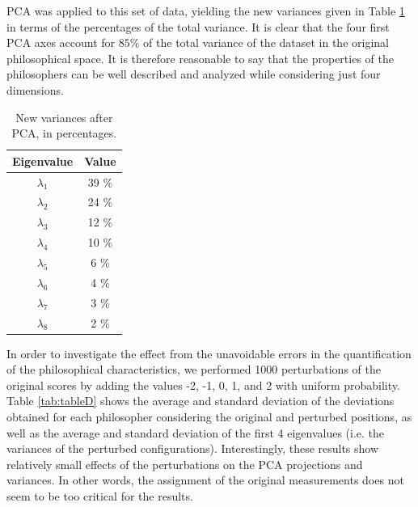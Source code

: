\documentclass[%
 aip,
 jmp,%
 amsmath,amssymb,
 reprint,%
]{revtex4-1}
\begin{document}
PCA was applied to this set of data, yielding the new variances given
in Table \ref{tab:tableC} in terms of the percentages of the total
variance.  It is clear that the four first PCA axes account for
$85\%$ of the total variance of the dataset in the original
philosophical space.  It is therefore reasonable to say that the
properties of the philosophers can be well described and analyzed
while considering just four dimensions.


\begin{table}%
\caption{\label{tab:tableC}New variances after PCA, in percentages.}

\begin{tabular}{|c||c|}
\hline
Eigenvalue & Value \\ \hline
$\lambda_1$ &  39 \% \\
$\lambda_2$ &  24 \% \\
$\lambda_3$ &  12 \% \\
$\lambda_4$ &  10 \% \\
$\lambda_5$ &   6 \% \\
$\lambda_6$ &   4 \% \\
$\lambda_7$ &   3 \%    \\
$\lambda_8$ &   2 \%    \\
\hline

\end{tabular}
\end{table}

In order to investigate the effect from the unavoidable errors in the
quantification of the philosophical characteristics, we performed 1000
perturbations of the original scores by adding the values -2, -1, 0,
1, and 2 with uniform probability.  Table \ref{tab:tableD} shows the
average and standard deviation of the deviations obtained for each
philosopher considering the original and perturbed positions, as well
as the average and standard deviation of the first 4 eigenvalues
(i.e. the variances of the perturbed configurations).  Interestingly,
these results show relatively small effects of the perturbations on
the PCA projections and variances.  In other words, the assignment of
the original measurements does not seem to be too critical for the
results.
\end{document}
